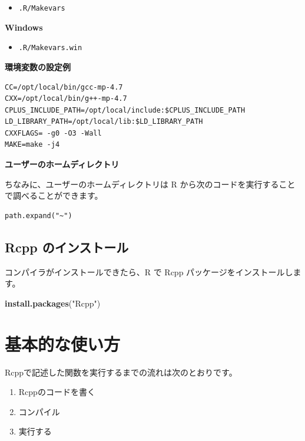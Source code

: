 \documentclass[]{book}
\newenvironment{Shaded}{\begin{snugshade}}{\end{snugshade}}
\newcommand{\KeywordTok}[1]{\textcolor[rgb]{0.13,0.29,0.53}{\textbf{#1}}}
\newcommand{\NormalTok}[1]{#1}
\newcommand{\StringTok}[1]{\textcolor[rgb]{0.31,0.60,0.02}{#1}}
\providecommand{\tightlist}{%
  \setlength{\itemsep}{0pt}\setlength{\parskip}{0pt}}
\begin{document}
\begin{itemize}
\tightlist
\item
  \texttt{.R/Makevars}
\end{itemize}

\textbf{Windows}

\begin{itemize}
\tightlist
\item
  \texttt{.R/Makevars.win}
\end{itemize}

\textbf{環境変数の設定例}

\begin{verbatim}
CC=/opt/local/bin/gcc-mp-4.7
CXX=/opt/local/bin/g++-mp-4.7
CPLUS_INCLUDE_PATH=/opt/local/include:$CPLUS_INCLUDE_PATH
LD_LIBRARY_PATH=/opt/local/lib:$LD_LIBRARY_PATH
CXXFLAGS= -g0 -O3 -Wall
MAKE=make -j4
\end{verbatim}

\textbf{ユーザーのホームディレクトリ}

ちなみに、ユーザーのホームディレクトリは R から次のコードを実行することで調べることができます。

\begin{verbatim}
path.expand("~")
\end{verbatim}

\hypertarget{rcpp-}{%
\section{Rcpp のインストール}\label{rcpp-}}

コンパイラがインストールできたら、R で Rcpp パッケージをインストールします。

\begin{Shaded}
\begin{Highlighting}[]
\KeywordTok{install.packages}\NormalTok{(}\StringTok{"Rcpp"}\NormalTok{)}
\end{Highlighting}
\end{Shaded}

\chapter{基本的な使い方}

Rcppで記述した関数を実行するまでの流れは次のとおりです。

\begin{enumerate}
\def\labelenumi{\arabic{enumi}.}
\tightlist
\item
  Rcppのコードを書く
\item
  コンパイル
\item
  実行する
\end{enumerate}
\end{document}
